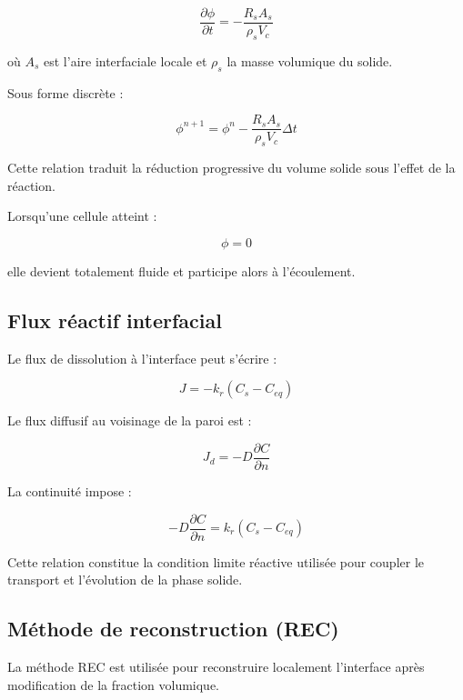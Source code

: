 \documentclass[12pt,a4paper]{report}
\begin{document}
\begin{equation}
\frac{\partial \phi}{\partial t}
=
-\frac{R_s A_s}{\rho_s V_c}
\end{equation}

où $A_s$ est l’aire interfaciale locale et $\rho_s$ la masse volumique du solide.

Sous forme discrète :

\begin{equation}
\phi^{n+1}
=
\phi^n
-
\frac{R_s A_s}{\rho_s V_c}\Delta t
\end{equation}

Cette relation traduit la réduction progressive du volume solide sous l’effet de la réaction.

Lorsqu’une cellule atteint :

\begin{equation}
\phi = 0
\end{equation}

elle devient totalement fluide et participe alors à l’écoulement.

\subsection{Flux réactif interfacial}

Le flux de dissolution à l’interface peut s’écrire :

\begin{equation}
J
=
-k_r(C_s-C_{eq})
\end{equation}

Le flux diffusif au voisinage de la paroi est :

\begin{equation}
J_d
=
-D
\frac{\partial C}{\partial n}
\end{equation}

La continuité impose :

\begin{equation}
-D
\frac{\partial C}{\partial n}
=
k_r(C_s-C_{eq})
\end{equation}

Cette relation constitue la condition limite réactive utilisée pour coupler le transport et l’évolution de la phase solide.

\subsection{Méthode de reconstruction (REC)}

La méthode REC est utilisée pour reconstruire localement l’interface après modification de la fraction volumique.
\end{document}
